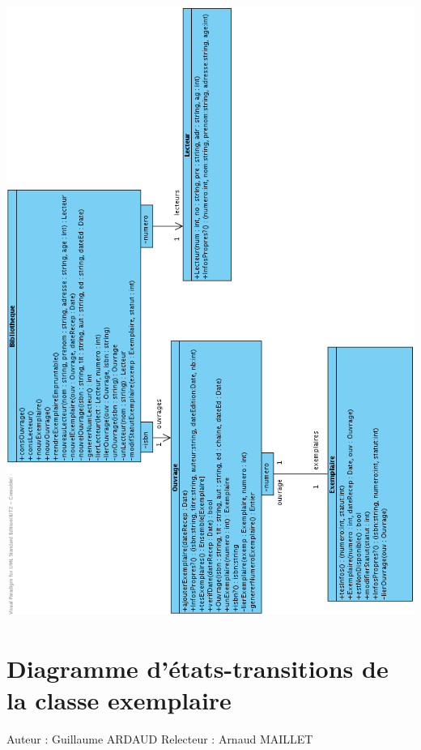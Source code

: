 \documentclass[a4paper,10pt]{report}
\begin{document}
\includegraphics[height=200mm]{DiagrammeClasseFinal.png}
\newpage


\section*{Diagramme d'états-transitions de la classe exemplaire}

Auteur : Guillaume ARDAUD
Relecteur : Arnaud MAILLET
\end{document}
